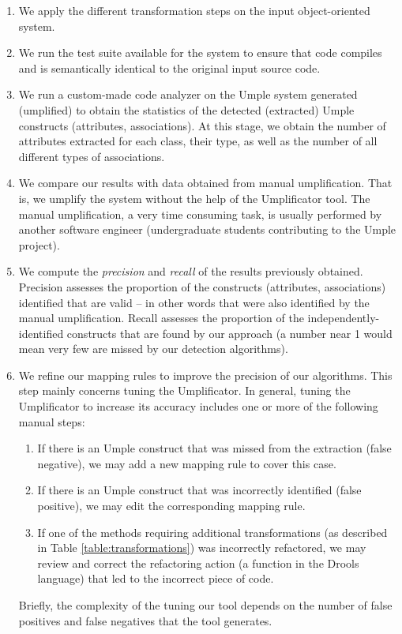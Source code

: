 \begin{enumerate}
\item We apply the different transformation steps on the input object-oriented system.

\item We run the test suite available for the system to ensure that code compiles and is semantically identical to the original input source code.

\item We run a custom-made code analyzer on the Umple system generated (umplified) to obtain the statistics of the detected (extracted) Umple constructs (attributes, associations). At this stage, we obtain the number of attributes extracted for each class, their type, as well as the number of all different types of associations.	

\item We compare our results with data obtained from manual umplification. That is, we umplify the system without the help of the Umplificator tool. The manual 	umplification, a very time consuming task, is usually performed by another software engineer (undergraduate students contributing to the Umple project). 

\item We compute the \textit{precision} and \textit{recall} of the results previously obtained. Precision assesses the proportion of the constructs (attributes, associations) identified that are valid -- in other words that were also identified by the manual umplification. Recall assesses the proportion of the independently-identified constructs that are found by our approach (a number near 1 would mean very few are missed by our detection algorithms). 

\item We refine our mapping rules to improve the precision of our algorithms. This step mainly concerns tuning the Umplificator. In general, tuning the Umplificator to increase its accuracy includes one or more of the following manual steps:

	\begin{enumerate}
		\item If there is an Umple construct that was missed from the extraction (false negative), we may add a new mapping rule to cover this case.
		
		\item If there is an Umple construct that was incorrectly identified (false positive), we may edit the corresponding mapping rule.
		\item If one of the methods requiring additional transformations (as described in Table \ref{table:transformations}) was incorrectly refactored, we may review and correct the refactoring action (a function in the Drools language) that led to the incorrect piece of code.

	\end{enumerate}
Briefly, the complexity of the tuning our tool depends on the number of false positives and false negatives that the tool generates. 
\end{enumerate}


